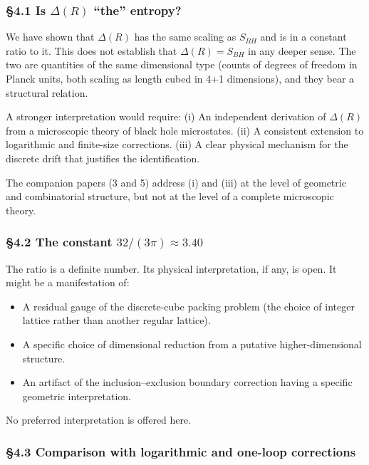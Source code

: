 \documentclass[a4paper,11pt]{article}
\theoremstyle{definition}
\providecommand{\tightlist}{\setlength{\itemsep}{0pt}\setlength{\parskip}{0pt}}
\begin{document}
\subsubsection{\texorpdfstring{§4.1 Is \(\Delta(R)\) ``the''
entropy?}{§4.1 Is \textbackslash Delta(R) ``the'' entropy?}}\label{is-deltar-the-entropy}

We have shown that \(\Delta(R)\) has the same scaling as \(S_{BH}\) and
is in a constant ratio to it. This does not establish that
\(\Delta(R) = S_{BH}\) in any deeper sense. The two are quantities of
the same dimensional type (counts of degrees of freedom in Planck units,
both scaling as length cubed in 4+1 dimensions), and they bear a
structural relation.

A stronger interpretation would require: (i) An independent derivation
of \(\Delta(R)\) from a microscopic theory of black hole microstates.
(ii) A consistent extension to logarithmic and finite-size corrections.
(iii) A clear physical mechanism for the discrete drift that justifies
the identification.

The companion papers (3 and 5) address (i) and (iii) at the level of
geometric and combinatorial structure, but not at the level of a
complete microscopic theory.

\subsubsection{\texorpdfstring{§4.2 The constant
\(32/(3\pi) \approx 3.40\)}{§4.2 The constant 32/(3\textbackslash pi) \textbackslash approx 3.40}}\label{the-constant-323pi-approx-3.40}

The ratio is a definite number. Its physical interpretation, if any, is
open. It might be a manifestation of:

\begin{itemize}
\tightlist
\item
  A residual gauge of the discrete-cube packing problem (the choice of
  integer lattice rather than another regular lattice).
\item
  A specific choice of dimensional reduction from a putative
  higher-dimensional structure.
\item
  An artifact of the inclusion--exclusion boundary correction having a
  specific geometric interpretation.
\end{itemize}

No preferred interpretation is offered here.

\subsubsection{§4.3 Comparison with logarithmic and one-loop
corrections}\label{comparison-with-logarithmic-and-one-loop-corrections}
\end{document}

